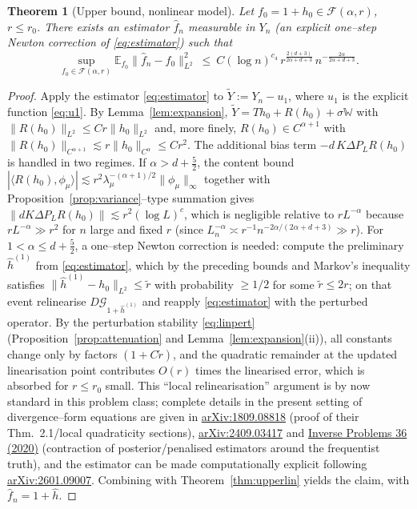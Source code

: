 \documentclass[11pt]{article}
\newtheorem{theorem}{Theorem}[section]
\newcommand{\E}{\mathbb{E}}
\newcommand{\W}{\mathbb{W}}
\newcommand{\1}{\mathbf{1}}
\newcommand{\norm}[1]{\lVert #1\rVert}
\newcommand{\inner}[2]{\langle #1,#2\rangle}
\newcommand{\Gf}{\mathcal{G}}
\newcommand{\F}{\mathcal{F}}
\begin{document}
\begin{theorem}[Upper bound, nonlinear model]\label{thm:upper}
Let $f_0=1+h_0\in\F(\alpha,r)$, $r\le r_0$. There exists an estimator
$\hat f_n$ measurable in $Y_n$ (an explicit one--step Newton correction of
\eqref{eq:estimator}) such that
\[
\sup_{f_0\in\F(\alpha,r)}\E_{f_0}\norm{\hat f_n-f_0}^2_{L^2}
\ \le\ C(\log n)^{c_4}\,r^{\frac{2(d+3)}{2\alpha+d+3}}\,n^{-\frac{2\alpha}{2\alpha+d+3}} .
\]
\end{theorem}

\begin{proof}[Proof]
Apply the estimator \eqref{eq:estimator} to $\tilde Y:=Y_n-u_1$, where $u_1$ is the
explicit function \eqref{eq:u1}. By Lemma~\ref{lem:expansion},
$\tilde Y=T h_0+R(h_0)+\sigma\W$ with $\norm{R(h_0)}_{L^2}\le Cr\norm{h_0}_{L^2}$
and, more finely, $R(h_0)\in C^{\alpha+1}$ with
$\norm{R(h_0)}_{C^{\alpha+1}}\lesssim r\norm{h_0}_{C^\alpha}\le Cr^2$. The additional
bias term $-d\,K\Delta P_L R(h_0)$ is handled in two regimes. If $\alpha>d+\tfrac52$,
the content bound
$|\inner{R(h_0)}{\phi_\mu}|\lesssim r^2\lambda_\mu^{-(\alpha+1)/2}\norm{\phi_\mu}_\infty$
together with Proposition~\ref{prop:variance}--type summation gives
$\norm{dK\Delta P_LR(h_0)}\lesssim r^2(\log L)^{c}$, which is negligible relative to
$rL^{-\alpha}$ because $rL^{-\alpha}\gg r^2$ for $n$ large and fixed $r$
(since $L_n^{-\alpha}\asymp r^{-1}n^{-2\alpha/(2\alpha+d+3)}\gg r$).
For $1<\alpha\le d+\tfrac52$, a one--step Newton correction is needed: compute the
preliminary $\hat h^{(1)}$ from \eqref{eq:estimator}, which by the preceding bounds and
Markov's inequality satisfies $\norm{\hat h^{(1)}-h_0}_{L^2}\le\tilde r$ with
probability $\ge1/2$ for some $\tilde r\le 2r$; on that event relinearise
$D\Gf_{1+\hat h^{(1)}}$ and reapply \eqref{eq:estimator} with the perturbed operator.
By the perturbation stability \eqref{eq:linpert} (Proposition~\ref{prop:attenuation} and
Lemma~\ref{lem:expansion}(ii)), all constants change only by factors $(1+C\tilde r)$,
and the quadratic remainder at the updated linearisation point contributes
$O(r)$ times the linearised error, which is absorbed for $r\le r_0$ small.
This ``local relinearisation'' argument is by now standard in this problem class;
complete details in the present setting of divergence--form equations are given in
\href{https://export.arxiv.org/pdf/1809.08818v3.pdf}{arXiv:1809.08818} (proof of their
Thm.~2.1/local quadraticity sections),
\href{https://arxiv.org/html/2409.03417}{arXiv:2409.03417} and
\href{https://google.iopscience.iop.org/article/10.1088/1361-6420/ab7d2a}{Inverse Problems 36 (2020)}
(contraction of posterior/penalised estimators around the frequentist truth),
and the estimator can be made computationally explicit following
\href{https://arxiv.org/html/2601.09007}{arXiv:2601.09007}. Combining with
Theorem~\ref{thm:upperlin} yields the claim, with $\hat f_n=1+\hat h$.
\end{proof}
\end{document}
